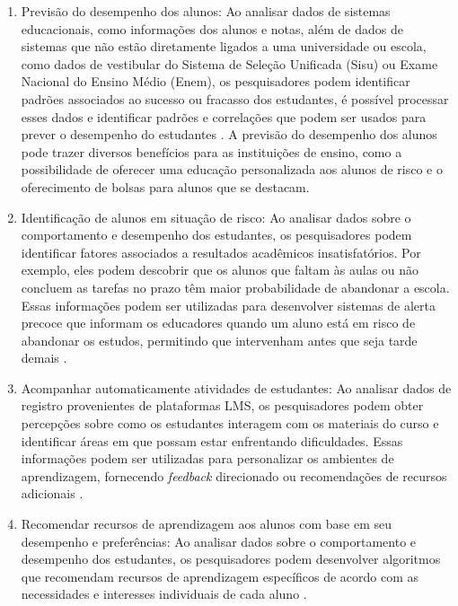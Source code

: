 \begin{enumerate}
    \item Previsão do desempenho dos alunos: Ao analisar dados de sistemas educacionais, como informações dos alunos e notas, além de dados de sistemas que não estão diretamente ligados a uma universidade ou escola, como dados de vestibular do Sistema de Seleção Unificada (Sisu) ou Exame Nacional do Ensino Médio (Enem), os pesquisadores podem identificar padrões associados ao sucesso ou fracasso dos estudantes, é possível processar esses dados e identificar padrões e correlações que podem ser usados para prever o desempenho do estudantes \cite{avaandparpinelli:2020}. A previsão do desempenho dos alunos pode trazer diversos benefícios para as instituições de ensino, como a possibilidade de oferecer uma educação personalizada aos alunos de risco e o oferecimento de bolsas para alunos que se destacam.

    \item Identificação de alunos em situação de risco: Ao analisar dados sobre o comportamento e desempenho dos estudantes, os pesquisadores podem identificar fatores associados a resultados acadêmicos insatisfatórios. Por exemplo, eles podem descobrir que os alunos que faltam às aulas ou não concluem as tarefas no prazo têm maior probabilidade de abandonar a escola. Essas informações podem ser utilizadas para desenvolver sistemas de alerta precoce que informam os educadores quando um aluno está em risco de abandonar os estudos, permitindo que intervenham antes que seja tarde demais \cite{ramos:2020}.

    \item Acompanhar automaticamente atividades de estudantes: Ao analisar dados de registro provenientes de plataformas LMS, os pesquisadores podem obter percepções sobre como os estudantes interagem com os materiais do curso e identificar áreas em que possam estar enfrentando dificuldades. Essas informações podem ser utilizadas para personalizar os ambientes de aprendizagem, fornecendo \textit{feedback} direcionado ou recomendações de recursos adicionais \cite{Santos2019}.

    \item Recomendar recursos de aprendizagem aos alunos com base em seu desempenho e preferências: Ao analisar dados sobre o comportamento e desempenho dos estudantes, os pesquisadores podem desenvolver algoritmos que recomendam recursos de aprendizagem específicos de acordo com as necessidades e interesses individuais de cada aluno \cite{9637207}.
\end{enumerate}

